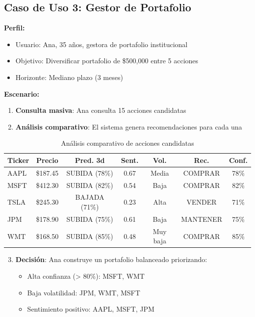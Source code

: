 \documentclass[12pt,a4paper]{report}
\begin{document}
\subsection{Caso de Uso 3: Gestor de Portafolio}

\textbf{Perfil:}
\begin{itemize}
    \item Usuario: Ana, 35 años, gestora de portafolio institucional
    \item Objetivo: Diversificar portafolio de \$500,000 entre 5 acciones
    \item Horizonte: Mediano plazo (3 meses)
\end{itemize}

\textbf{Escenario:}

\begin{enumerate}
    \item \textbf{Consulta masiva}: Ana consulta 15 acciones candidatas
    \item \textbf{Análisis comparativo}: El sistema genera recomendaciones para cada una
\end{enumerate}

\begin{table}[H]
\centering
\caption{Análisis comparativo de acciones candidatas}
\label{tab:portafolio}
\small
\begin{tabular}{lcccccc}
\toprule
\textbf{Ticker} & \textbf{Precio} & \textbf{Pred. 3d} & \textbf{Sent.} & \textbf{Vol.} & \textbf{Rec.} & \textbf{Conf.} \\
\midrule
AAPL & \$187.45 & SUBIDA (78\%) & 0.67 & Media & COMPRAR & 78\% \\
MSFT & \$412.30 & SUBIDA (82\%) & 0.54 & Baja & COMPRAR & 82\% \\
TSLA & \$245.30 & BAJADA (71\%) & 0.23 & Alta & VENDER & 71\% \\
JPM & \$178.90 & SUBIDA (75\%) & 0.61 & Baja & MANTENER & 75\% \\
WMT & \$168.50 & SUBIDA (85\%) & 0.48 & Muy baja & COMPRAR & 85\% \\
\bottomrule
\end{tabular}
\end{table}

\begin{enumerate}
    \setcounter{enumi}{2}
    \item \textbf{Decisión}: Ana construye un portafolio balanceado priorizando:
    \begin{itemize}
        \item Alta confianza (> 80\%): MSFT, WMT
        \item Baja volatilidad: JPM, WMT, MSFT
        \item Sentimiento positivo: AAPL, MSFT, JPM
    \end{itemize}
\end{enumerate}
\end{document}
